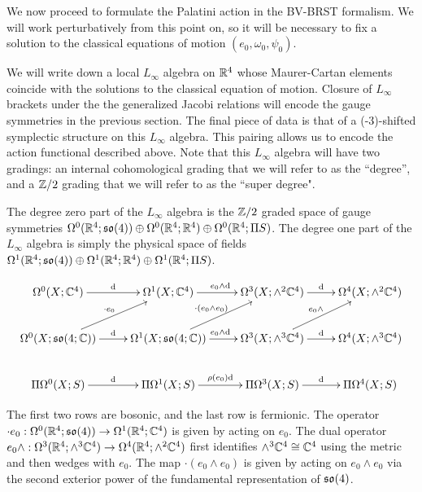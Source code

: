 We now proceed to formulate the Palatini action in the BV-BRST formalism. 
We will work perturbatively from this point on, so it will be necessary to fix a solution to the classical equations of motion $(e_0,\omega_0,\psi_0)$. 

We will write down a local $L_\infty$ algebra on $\mathbb R^4$ whose Maurer-Cartan elements coincide with the solutions to the classical equation of motion.
Closure of $L_\infty$ brackets under the the generalized Jacobi relations will encode the gauge symmetries in the previous section. 
The final piece of data is that of a (-3)-shifted symplectic structure on this $L_\infty$ algebra. 
This pairing allows us to encode the action functional described above. 
Note that this $L_\infty$ algebra will have two gradings: an internal cohomological grading that we will refer to as the ``degree'', and a $\mathbb Z/2$ grading that we will refer to as the ``super degree". 

The degree zero part of the $L_\infty$ algebra is the $\mathbb Z/2$ graded space of gauge symmetries $\Omega^0(\mathbb R^4 ; \mathfrak s\mathfrak o(4)) \oplus \Omega^0(\mathbb R^4 ; \mathbb R^4) \oplus \Omega^0(\mathbb R^4 ; \Pi S)$. 
The degree one part of the $L_\infty$ algebra is simply the physical space of fields $\Omega^1(\mathbb R^4 ; \mathfrak s\mathfrak o(4)) \oplus \Omega^1(\mathbb R^4 ; \mathbb R^4) \oplus \Omega^1(\mathbb R^4 ; \Pi S)$. 

\[\xymatrix{
   \Omega^0(X; \CC^4) \ar[r]^\d & \Omega^1(X; \CC^4) \ar[r]^{e_0 \wedge \d} &\Omega^3(X; \wedge^2 \CC^4) \ar[r]^\d &\Omega^4(X; \wedge^2 \CC^4) \\
   \Omega^0(X; \so(4;\CC)) \ar[r]^\d \ar[ur]^{\cdot  e_0} & \Omega^1(X; \so(4;\CC)) \ar[r]^{e_0 \wedge \d} \ar[ur]^{\cdot(e_0 \wedge e_0)} &\Omega^3(X; \wedge^3 \CC^4) \ar[r]^\d \ar[ur]^{e_0 \wedge} &\Omega^4(X; \wedge^3 \CC^4) \\
   \Pi\Omega^0(X; S) \ar[r]^\d & \Pi\Omega^1(X; S) \ar[r]^{\rho(e_0) \d} &\Pi\Omega^3(X; S) \ar[r]^\d &\Pi\Omega^4(X; S) \\
}\]

The first two rows are bosonic, and the last row is fermionic. 
The operator $\cdot e_0 : \Omega^0(\mathbb R^4 ; \mathfrak s \mathfrak o(4)) \to \Omega^1(\mathbb R^4 ; \mathbb C^4)$ is given by acting on $e_0$. 
The dual operator $e_0 \wedge : \Omega^3(\mathbb R^4 ; \wedge^3 \mathbb C^4) \to \Omega^4(\mathbb R^4 ; \wedge^2 \mathbb C^4)$ first identifies $\wedge^3 \mathbb C^4 \cong \mathbb C^4$ using the metric and then wedges with $e_0$. 
The map $\cdot (e_0 \wedge e_0)$ is given by acting on $e_0 \wedge e_0$ via the second exterior power of the fundamental representation of $\mathfrak s \mathfrak o (4)$. 

